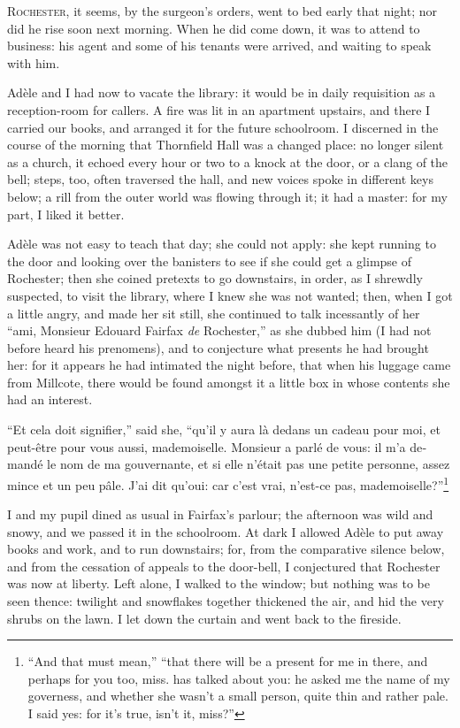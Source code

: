 
 \textsc{ Rochester,} it seems, by the surgeon's orders, went to bed early that
night; nor did he rise soon next morning. When he did come down, it was
to attend to business: his agent and some of his tenants were arrived,
and waiting to speak with him.

Adèle and I had now to vacate the library: it would be in daily
requisition as a reception-room for callers. A fire was lit in an
apartment upstairs, and there I carried our books, and arranged it for
the future schoolroom. I discerned in the course of the morning that
Thornfield Hall was a changed place: no longer silent as a church, it
echoed every hour or two to a knock at the door, or a clang of the bell;
steps, too, often traversed the hall, and new voices spoke in different
keys below; a rill from the outer world was flowing through it; it had a
master: for my part, I liked it better.

Adèle was not easy to teach that day; she could not apply: she kept
running to the door and looking over the banisters to see if she could
get a glimpse of \Mr{} Rochester; then she coined pretexts to go
downstairs, in order, as I shrewdly suspected, to visit the library,
where I knew she was not wanted; then, when I got a little angry, and
made her sit still, she continued to talk incessantly of her \foreignquote{french}{ami,
	Monsieur Edouard Fairfax \emph{de} Rochester,} as she dubbed him (I had
not before heard his prenomens), and to conjecture what presents he had
brought her: for it appears he had intimated the night before, that when
his luggage came from Millcote, there would be found amongst it a little
box in whose contents she had an interest.

\foreignquote{french}{Et cela doit signifier,} said she, \foreignquote{french}{qu'il y aura là
	dedans un cadeau pour moi, et peut-être pour vous aussi, mademoiselle.
	Monsieur a parlé de vous: il m'a demandé le nom de ma gouvernante, et si
	elle n'était pas une petite personne, assez mince et un peu pâle. J'ai
	dit qu'oui: car c'est vrai, n'est-ce pas, mademoiselle?}\footnote{%
	\enquote{And that must mean,} \textelp{} \enquote{that there will be a present
		for me in there, and perhaps for you too, miss. \Mr{} has talked about you:
		he asked me the name of my governess, and whether she wasn't a small
		person, quite thin and rather pale. I said yes: for it's true, isn't it, miss?}}

I and my pupil dined as usual in \Mrs{} Fairfax's parlour; the afternoon
was wild and snowy, and we passed it in the schoolroom. At dark I
allowed Adèle to put away books and work, and to run downstairs; for,
from the comparative silence below, and from the cessation of appeals to
the door-bell, I conjectured that \Mr{} Rochester was now at liberty.
Left alone, I walked to the window; but nothing was to be seen thence:
twilight and snowflakes together thickened the air, and hid the very
shrubs on the lawn. I let down the curtain and went back to the
fireside.

